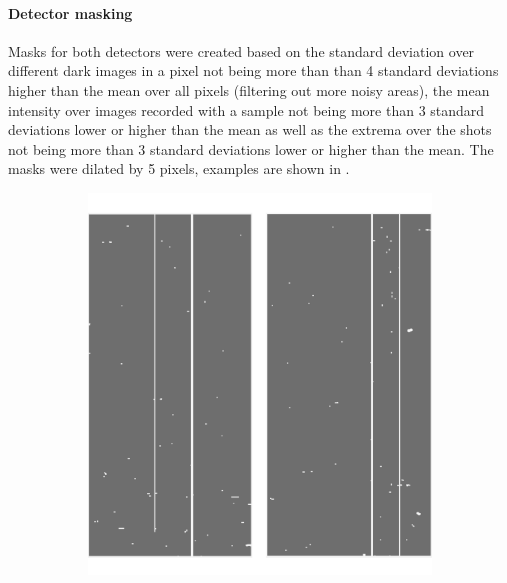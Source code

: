 \paragraph{Detector masking}
Masks for both detectors were created based on the standard deviation over different dark images in a pixel not being more than than 4 standard deviations higher than the mean over all pixels (filtering out more noisy areas), the mean intensity over images recorded with a sample not being more than 3 standard deviations lower or higher than the mean as well as the extrema over the shots not being more than 3 standard deviations lower or higher than the mean. The masks were dilated by 5 pixels, examples are shown in .

\begin{figure}
	\centering
	\begin{subfigure}{0.3\textwidth}
		\includegraphics[width=\linewidth]{images/mask_dual.png}
	\end{subfigure}
	\hspace{1cm}
	\begin{subfigure}{0.3\textwidth}

\end{subfigure}
\end{figure}
